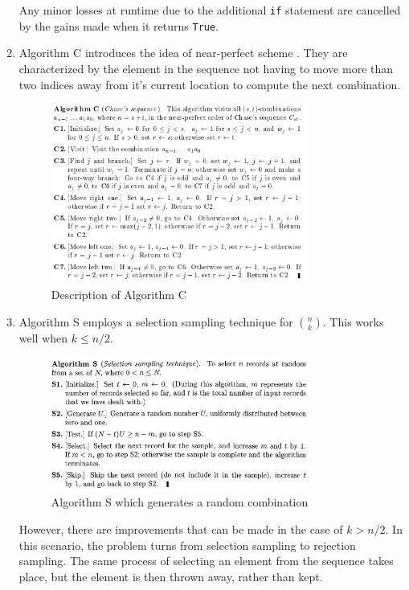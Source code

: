 \documentclass[12pt]{article}
\begin{document}
\begin{enumerate}
Any minor losses at runtime due to the additional \lstinline{if} statement are cancelled by the gains made when it returns \lstinline{True}.

\pagebreak

\item Algorithm C introduces the idea of near-perfect scheme \cite{comb_C}. They are characterized by the element in the sequence not having to move more than two indices away from it's current location to  compute the next combination.

\begin{figure}[h]
\centering
\includegraphics[width=0.8\textwidth]{images/comb_C.PNG}
\caption{Description of Algorithm C \cite{comb_C}}
\end{figure}

\pagebreak

\item Algorithm S employs a selection sampling technique for \(n \choose k\). This works well when \(k \leq n/2\).

\begin{figure}[h]
\centering
\includegraphics[width=0.8\textwidth]{images/rand_comb.PNG}
\caption{Algorithm S which generates a random combination \cite{rand_comb}}
\end{figure}


However, there are improvements that can be made in the case of \(k > n/2\). In this scenario, the problem turns from selection sampling to rejection sampling. The same process of selecting an element from the sequence takes place, but the element is then thrown away, rather than kept. 
\end{enumerate}
\end{document}
